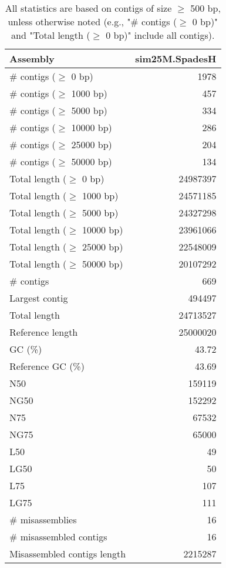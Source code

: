 \documentclass[12pt,a4paper]{article}
\begin{document}
\begin{table}[ht]
\begin{center}
\caption{All statistics are based on contigs of size $\geq$ 500 bp, unless otherwise noted (e.g., "\# contigs ($\geq$ 0 bp)" and "Total length ($\geq$ 0 bp)" include all contigs).}
\begin{tabular}{|l*{1}{|r}|}
\hline
Assembly & sim25M.SpadesH \\ \hline
\# contigs ($\geq$ 0 bp) & 1978 \\ \hline
\# contigs ($\geq$ 1000 bp) & 457 \\ \hline
\# contigs ($\geq$ 5000 bp) & 334 \\ \hline
\# contigs ($\geq$ 10000 bp) & 286 \\ \hline
\# contigs ($\geq$ 25000 bp) & 204 \\ \hline
\# contigs ($\geq$ 50000 bp) & 134 \\ \hline
Total length ($\geq$ 0 bp) & 24987397 \\ \hline
Total length ($\geq$ 1000 bp) & 24571185 \\ \hline
Total length ($\geq$ 5000 bp) & 24327298 \\ \hline
Total length ($\geq$ 10000 bp) & 23961066 \\ \hline
Total length ($\geq$ 25000 bp) & 22548009 \\ \hline
Total length ($\geq$ 50000 bp) & 20107292 \\ \hline
\# contigs & 669 \\ \hline
Largest contig & 494497 \\ \hline
Total length & 24713527 \\ \hline
Reference length & 25000020 \\ \hline
GC (\%) & 43.72 \\ \hline
Reference GC (\%) & 43.69 \\ \hline
N50 & 159119 \\ \hline
NG50 & 152292 \\ \hline
N75 & 67532 \\ \hline
NG75 & 65000 \\ \hline
L50 & 49 \\ \hline
LG50 & 50 \\ \hline
L75 & 107 \\ \hline
LG75 & 111 \\ \hline
\# misassemblies & 16 \\ \hline
\# misassembled contigs & 16 \\ \hline
Misassembled contigs length & 2215287 \\ \hline

\end{tabular}
\end{center}
\end{table}
\end{document}
